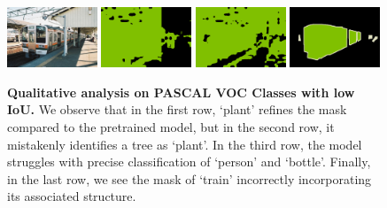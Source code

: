 \begin{figure}[tbhp!]
  {\includegraphics[width=0.24\textwidth]{figures/experiments/pascal/image/0017.jpg}}
  {\includegraphics[width=0.24\textwidth]{figures/experiments/pascal/orgckpt/0017.png}}
  {\includegraphics[width=0.24\textwidth]{figures/experiments/pascal/nonnoisybaseline/0017.png}}
  {\includegraphics[width=0.24\textwidth]{figures/experiments/pascal/gt/2007_000636.png}}

  \caption[\textbf{Qualitative analysis on PASCAL VOC Classes with low IoU}]{\textbf{Qualitative analysis on PASCAL VOC  Classes with low IoU.} We observe that in the first row, `plant' refines the mask compared to the pretrained model, but in the second row, it mistakenly identifies a tree as `plant'. In the third row, the model struggles with precise classification of `person' and `bottle'. Finally, in the last row, we see the mask of `train' incorrectly incorporating its associated structure. }
  \label{fig:pascalbad}
\end{figure}
